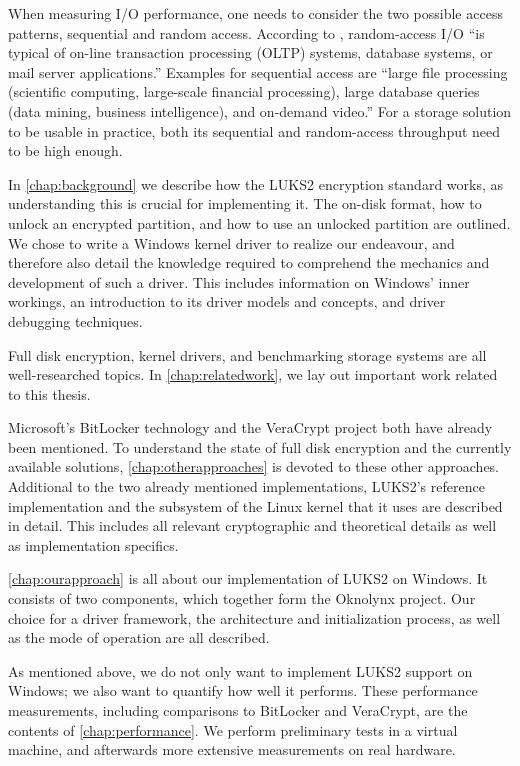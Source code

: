 When measuring I/O performance, one needs to consider the two possible access patterns, sequential and random access. According to \cite{Traeger2008}, random-access I/O ``is typical of on-line transaction processing (OLTP) systems, database systems, or mail server applications.'' Examples for sequential access are ``large file processing (scientific computing, large-scale financial processing), large database queries (data mining, business intelligence), and on-demand video.'' For a storage solution to be usable in practice, both its sequential and random-access throughput need to be high enough.

In \autoref{chap:background} we describe how the LUKS2 encryption standard works, as understanding this is crucial for implementing it. The on-disk format, how to unlock an encrypted partition, and how to use an unlocked partition are outlined. We chose to write a Windows kernel driver to realize our endeavour, and therefore also detail the knowledge required to comprehend the mechanics and development of such a driver. This includes information on Windows' inner workings, an introduction to its driver models and concepts, and driver debugging techniques.

Full disk encryption, kernel drivers, and benchmarking storage systems are all well-researched topics. In \autoref{chap:relatedwork}, we lay out important work related to this thesis.

Microsoft's BitLocker technology and the VeraCrypt project both have already been mentioned. To understand the state of full disk encryption and the currently available solutions, \autoref{chap:otherapproaches} is devoted to these other approaches. Additional to the two already mentioned implementations, LUKS2's reference implementation and the subsystem of the Linux kernel that it uses are described in detail. This includes all relevant cryptographic and theoretical details as well as implementation specifics.

\autoref{chap:ourapproach} is all about our implementation of LUKS2 on Windows. It consists of two components, which together form the Oknolynx project. Our choice for a driver framework, the architecture and initialization process, as well as the mode of operation are all described.

As mentioned above, we do not only want to implement LUKS2 support on Windows; we also want to quantify how well it performs. These performance measurements, including comparisons to BitLocker and VeraCrypt, are the contents of \autoref{chap:performance}. We perform preliminary tests in a virtual machine, and afterwards more extensive measurements on real hardware.

